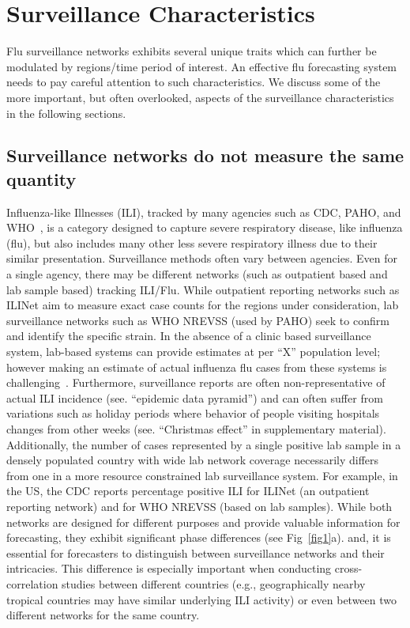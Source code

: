 \documentclass[10pt,letterpaper]{article}
\begin{document}
\section*{Surveillance Characteristics}
Flu surveillance networks exhibits several unique traits which can further be
modulated by regions/time period of interest. An effective flu forecasting 
system needs to pay careful attention to such characteristics. We discuss some
of the more important, but often overlooked, aspects of the surveillance
characteristics in the following sections.

\subsection*{Surveillance networks do not measure the same quantity}
Influenza-like Illnesses (ILI), tracked by many agencies such as CDC, PAHO, and
WHO~\cite{cdc,paho,who}, is a category designed to capture severe respiratory
disease, like influenza (flu), but also includes many other less severe
respiratory illness due to their similar presentation. Surveillance methods
often vary between agencies. Even for a single agency, there may be different
networks (such as outpatient based and lab sample based) tracking ILI/Flu.
While outpatient reporting networks such as ILINet aim to measure exact case
counts for the regions under consideration, lab surveillance networks such as
WHO NREVSS (used by PAHO) seek to confirm and identify the specific strain.  In
the absence of a clinic based surveillance system, lab-based systems can
provide estimates at per ``X'' population level; however making an estimate of
actual influenza flu cases from these systems is challenging~\cite{cdc}.
Furthermore, surveillance reports are often non-representative of actual ILI
incidence (see. ``epidemic data pyramid'') and can often suffer from variations
such as holiday periods where behavior of people visiting hospitals changes
from other weeks (see.  ``Christmas effect'' in supplementary material).
Additionally, the number of cases represented by a single positive lab sample
in a densely populated country with wide lab network coverage necessarily
differs from one in a more resource constrained lab surveillance system. For
example, in the US, the CDC reports percentage positive ILI for ILINet (an
outpatient reporting network) and for WHO NREVSS (based on lab samples). While
both networks are designed for different purposes and provide valuable
information for forecasting, they exhibit significant phase differences (see
Fig~\ref{fig1}a).  and, it is essential for forecasters to distinguish between
surveillance networks and their intricacies.  This difference is especially
important when conducting cross-correlation studies between different countries
(e.g., geographically nearby tropical countries may have similar underlying ILI
activity) or even between two different networks for the same country.
\end{document}
